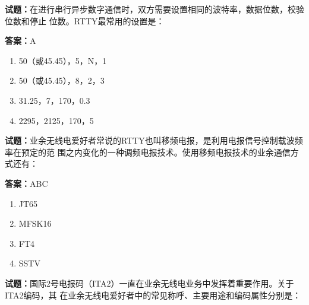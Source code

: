 \documentclass{ctexbook}
\begin{document}




\vspace{1em}

\textbf{试题：}在进行串行异步数字通信时，双方需要设置相同的波特率，数据位数，校验位数和停止
位数。RTTY最常用的设置是： 

\textbf{答案：}A 

\begin{enumerate}[leftmargin=3em]
  \item 50（或45.45），5，N，1 

  \item 50（或45.45），8，2，3 

  \item 31.25，7，170，0.3 

  \item 2295，2125，170，5 

\end{enumerate}






\vspace{1em}

\textbf{试题：}业余无线电爱好者常说的RTTY也叫移频电报，是利用电报信号控制载波频率在预定的范
围之内变化的一种调频电报技术。使用移频电报技术的业余通信方式还有： 

\textbf{答案：}ABC 

\begin{enumerate}[leftmargin=3em]
  \item JT65 

  \item MFSK16 

  \item FT4 

  \item SSTV 

\end{enumerate}





\vspace{1em}

\textbf{试题：}国际2号电报码（ITA2）一直在业余无线电业务中发挥着重要作用。关于ITA2编码，其
在业余无线电爱好者中的常见称呼、主要用途和编码属性分别是： 
\end{document}
